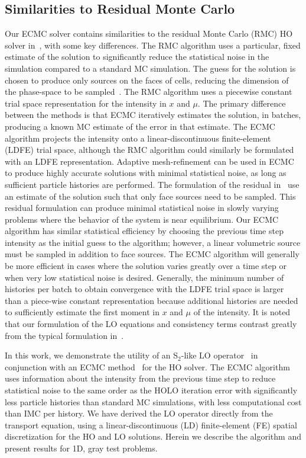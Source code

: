 \subsection{Similarities to Residual Monte Carlo}

Our ECMC solver contains similarities to the residual Monte Carlo (RMC) HO solver
in~\cite{rmc}, with some key differences.  The RMC algorithm uses a particular, fixed 
estimate of the solution to significantly reduce the statistical noise in the
simulation compared to a standard MC simulation. The guess for the solution is chosen to produce only sources on the faces of
cells, reducing the dimension of the phase-space to be sampled~\cite{rmc}. The RMC
algorithm  uses a piecewise constant trial space representation for the intensity in
$x$ and $\mu$.
The primary difference between the methods is that ECMC iteratively estimates the
solution, in batches, producing a known MC estimate
of the error in that estimate.  The ECMC algorithm projects the intensity onto a linear-discontinuous
finite-element (LDFE) trial space, although the RMC
algorithm could similarly be formulated with an LDFE representation.  Adaptive
mesh-refinement can be used in ECMC to produce highly accurate solutions with minimal
statistical noise, as long as sufficient particle histories are performed. 
The formulation of the residual in~\cite{rmc} use an estimate of the solution such
that only face sources need to be sampled.  This residual formulation can produce minimal
statistical noise in slowly varying problems where the behavior of the system is near
equilibrium. Our ECMC algorithm has similar statistical efficiency by choosing the previous time step intensity as the initial guess to
the algorithm; however, a linear volumetric source must be sampled in addition to face
sources.  The ECMC algorithm will generally be more efficient in cases where
the solution varies greatly over a time step or when very low statistical noise is
desired.  Generally, the minimum number of histories per batch to obtain convergence with the
LDFE trial space is larger than a piece-wise constant representation because additional
histories are needed to sufficiently estimate the first moment in $x$ and $\mu$ of the
intensity. 
It is noted that our formulation of the LO
equations and consistency terms contrast greatly from the typical formulation
in~\cite{rmc,willert,park}.  

In this work, we demonstrate the utility of an S$_2$-like LO operator~\cite{wolters}
in conjunction with an ECMC method~\cite{jake} for the HO solver.
The ECMC algorithm uses information about the intensity from the previous time step to reduce statistical noise to the same order as
the HOLO iteration error with significantly less particle histories than standard MC
simulations, with less computational cost than IMC per history.  We have derived the LO operator directly from the transport
equation, using a linear-discontinuous (LD) finite-element (FE) spatial
discretization for the HO and LO solutions. Herein we describe the algorithm and
present results for 1D, gray test problems.

